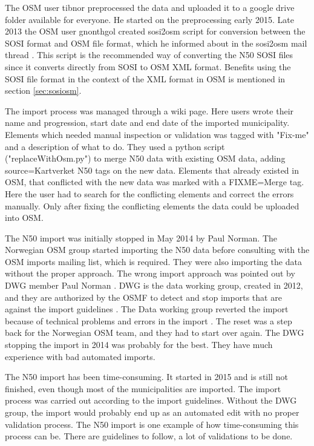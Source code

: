 The OSM user tibnor preprocessed the data and uploaded it to a google drive folder available for everyone. He started on the preprocessing early 2015. Late 2013 the OSM user gnonthgol created sosi2osm script for conversion between the SOSI format and OSM file format, which he informed about in the sosi2osm mail thread \cite{Gnonthgol2013}. This script is the recommended way of converting the N50 SOSI files since it converts directly from SOSI to OSM XML format. Benefits using the SOSI file format in the context of the XML format in OSM is mentioned in section \ref{sec:sosiosm}.

The import process was managed through a wiki page. Here users wrote their name and progression, start date and end date of the imported municipality. Elements which needed manual inspection or validation was tagged with "Fix-me" and a description of what to do. They used a python script ("replaceWithOsm.py") to merge N50 data with existing OSM data, adding source=Kartverket N50 tags on the new data. Elements that already existed in OSM, that conflicted with the new data was marked with a FIXME=Merge tag. Here the user had to search for the conflicting elements and correct the errors manually. Only after fixing the conflicting elements the data could be uploaded into OSM. 

The N50 import was initially stopped in May 2014 by Paul Norman. The Norwegian OSM group started importing the N50 data before consulting with the OSM imports mailing list, which is required. They were also importing the data without the proper approach. The wrong import approach was pointed out by DWG member Paul Norman \cite{Mehus2014}.  DWG is the data working group, created in 2012, and they are authorized by the OSMF to detect and stop imports that are against the import guidelines \cite{OSMDWG}. The Data working group reverted the import because of technical problems and errors in the import \cite{Didriksen2014}. The reset was a step back for the Norwegian OSM team, and they had to start over again. The DWG stopping the import in 2014 was probably for the best. They have much experience with bad automated imports. 

The N50 import has been time-consuming. It started in 2015 and is still not finished, even though most of the municipalities are imported. The import process was carried out according to the import guidelines. Without the DWG group, the import would probably end up as an automated edit with no proper validation process. The N50 import is one example of how time-consuming this process can be. There are guidelines to follow, a lot of validations to be done. 

